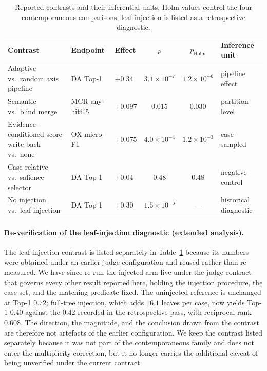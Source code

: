 \documentclass[letterpaper]{article}
\begin{document}
\begin{table}[t]
\centering
\small
\begin{tabular}{@{}lllcc l@{}}
\toprule
Contrast & Endpoint & Effect & $p$ & $p_{\mathrm{Holm}}$ & Inference unit \\
\midrule
Adaptive vs.\ random axis pipeline & DA Top-1 & $+0.34$ & $3.1{\times}10^{-7}$ & $1.2{\times}10^{-6}$ & pipeline effect \\
Semantic vs.\ blind merge & MCR any-hit@5 & $+0.097$ & $0.015$ & $0.030$ & partition-level \\
Evidence-conditioned score write-back vs.\ none & OX micro-F1 & $+0.075$ & $4.0{\times}10^{-4}$ & $1.2{\times}10^{-3}$ & case-sampled \\
Case-relative vs.\ salience selector & DA Top-1 & $+0.04$ & $0.48$ & $0.48$ & negative control \\
\midrule
No injection vs.\ leaf injection & DA Top-1 & $+0.30$ & $1.5{\times}10^{-5}$ & --- & historical diagnostic \\
\bottomrule
\end{tabular}
\caption{Reported contrasts and their inferential units. Holm values control the four contemporaneous comparisons; leaf injection is listed as a retrospective diagnostic.}
\label{tab:confirmatory}
\end{table}

\paragraph{Re-verification of the leaf-injection diagnostic (extended analysis).}
The leaf-injection contrast is listed separately in Table~\ref{tab:confirmatory} because its numbers were obtained under an earlier judge configuration and reused rather than re-measured.
We have since re-run the injected arm live under the judge contract that governs every other result reported here, holding the injection procedure, the case set, and the matching predicate fixed.
The uninjected reference is unchanged at Top-1 $0.72$; full-tree injection, which adds $16.1$ leaves per case, now yields Top-1 $0.40$ against the $0.42$ recorded in the retrospective pass, with reciprocal rank $0.608$.
The direction, the magnitude, and the conclusion drawn from the contrast are therefore not artefacts of the earlier configuration.
We keep the contrast listed separately because it was not part of the contemporaneous family and does not enter the multiplicity correction, but it no longer carries the additional caveat of being unverified under the current contract.
\end{document}
